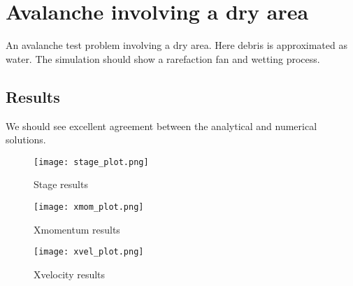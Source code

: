 
\section{Avalanche involving a dry area}

An avalanche test problem involving a dry area. Here debris is approximated as water. The simulation should show a rarefaction fan and wetting process. 

\subsection{Results}


We should see excellent agreement between the analytical and numerical solutions.

\begin{figure}[h]
\begin{center}
\texttt{[image: stage\_plot.png]}
\end{center}
\caption{Stage results}
\end{figure}


\begin{figure}[h]
\begin{center}
\texttt{[image: xmom\_plot.png]}
\end{center}
\caption{Xmomentum results}
\end{figure}


\begin{figure}[h]
\begin{center}
\texttt{[image: xvel\_plot.png]}
\end{center}
\caption{Xvelocity results}
\end{figure}


\endinput
